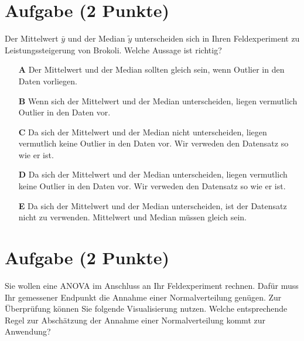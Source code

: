 \documentclass[a4paper, 9pt]{scrartcl}\usepackage[]{graphicx}\usepackage[]{xcolor}
\begin{document}
\section{Aufgabe \hfill (2 Punkte)}



Der Mittelwert $\bar{y}$ und der Median $\tilde{y}$ unterscheiden sich in Ihren Feldexperiment zu Leistungssteigerung von Brokoli.  Welche Aussage ist richtig?



\begin{enumerate}
\item [\textbf{A} \msquare] Der Mittelwert und der Median sollten gleich sein, wenn Outlier in den Daten vorliegen. 
\item [\textbf{B} \msquare] Wenn sich der Mittelwert und der Median unterscheiden, liegen vermutlich Outlier in den Daten vor.
\item [\textbf{C} \msquare] Da sich der Mittelwert und der Median nicht unterscheiden, liegen vermutlich keine Outlier in den Daten vor. Wir verweden den Datensatz so wie er ist.
\item [\textbf{D} \msquare] Da sich der Mittelwert und der Median unterscheiden, liegen vermutlich keine Outlier in den Daten vor. Wir verweden den Datensatz so wie er ist.
\item [\textbf{E} \msquare] Da sich der Mittelwert und der Median unterscheiden, ist der Datensatz nicht zu verwenden. Mittelwert und Median müssen gleich sein.
\end{enumerate}

\section{Aufgabe \hfill (2 Punkte)}



Sie wollen eine ANOVA im Anschluss an Ihr Feldexperiment rechnen. Dafür muss Ihr gemessener Endpunkt die Annahme einer Normalverteilung genügen. Zur Überprüfung können Sie folgende Visualisierung nutzen. Welche entsprechende Regel zur Abschätzung der Annahme einer Normalverteilung kommt zur Anwendung?
\end{document}
